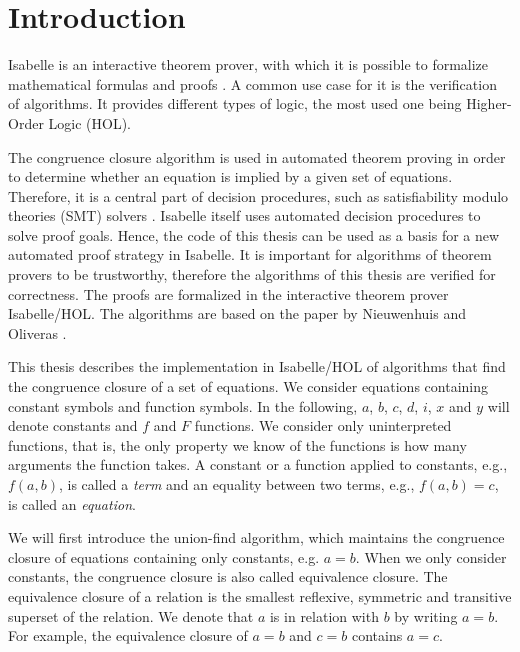 
\chapter{Introduction}\label{chapter:introduction}

Isabelle is an interactive theorem prover, with which it is possible to formalize mathematical formulas and proofs \cite{isabelle}. A common use case for it is the verification of algorithms.
It provides different types of logic, the most used one being Higher-Order Logic (HOL).

The congruence closure algorithm is used in automated theorem proving in order to determine whether an equation is implied by a given set of equations.
Therefore, it is a central part of decision procedures, such as satisfiability modulo theories (SMT) solvers \cite{z3}.
Isabelle itself uses automated decision procedures to solve proof goals.
Hence, the code of this thesis can be used as a basis for a new automated proof strategy in Isabelle.
It is important for algorithms of theorem provers to be trustworthy, therefore the algorithms of this thesis are verified for correctness.
The proofs are formalized in the interactive theorem prover Isabelle/HOL.
The algorithms are based on the paper by Nieuwenhuis and Oliveras \cite{Nieuwenhuis}.

This thesis describes the implementation in Isabelle/HOL of algorithms that find the congruence closure of a set of equations. We consider equations containing constant symbols and function symbols. In the following, $a$, $b$, $c$, $d$, $i$, $x$ and $y$ will denote constants and $f$ and $F$ functions.
We consider only uninterpreted functions, that is, the only property we know of the functions is how many arguments the function takes.
A constant or a function applied to constants, e.g., $f(a, b)$, is called a \emph{term} and an equality between two terms, e.g., $f(a, b) = c$, is called an \emph{equation}.

We will first introduce the union-find algorithm, which maintains the congruence closure of equations containing only constants, e.g. $a = b$. When we only consider constants, the congruence closure is also called equivalence closure. The equivalence closure of a relation is the smallest reflexive, symmetric and transitive superset of the relation. We denote that $a$ is in relation with $b$ by writing $a = b$. For example, the equivalence closure of $a = b$ and $c = b$ contains $a = c$.

